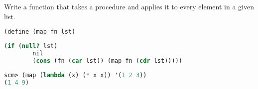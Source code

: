 \question Write a function that takes a procedure and applies it to every
element in a given list.
\begin{lstlisting}[language=Scheme]
(define (map fn lst)
\end{lstlisting}
\begin{solution}[1.0in]
\begin{lstlisting}[language=Scheme]
    (if (null? lst)
        nil
        (cons (fn (car lst)) (map fn (cdr lst)))))
\end{lstlisting}
\end{solution}
\begin{lstlisting}[language=Scheme]
scm> (map (lambda (x) (* x x)) '(1 2 3))
(1 4 9)
\end{lstlisting}
